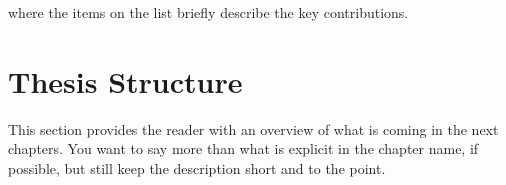 \noindent
where the items on the list briefly describe the key contributions.

\section{Thesis Structure}
\label{sec:thesisStructure}

This section provides the reader with an overview of what is coming in the next chapters. 
You want to say more than what is explicit in the chapter name, if possible, but still keep the description short and to the point. 

\glsresetall
